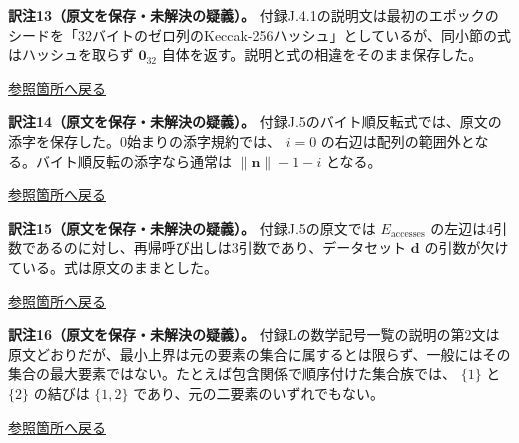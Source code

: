\documentclass[
]{ltjsarticle}
\begin{document}
\leavevmode{}%
\textbf{訳注13（原文を保存・未解決の疑義）。}
付録J.4.1の説明文は最初のエポックのシードを「32バイトのゼロ列のKeccak-256ハッシュ」としているが、同小節の式はハッシュを取らず
\(\mathbf{0}_{32}\) 自体を返す。説明と式の相違をそのまま保存した。

\protect\hyperlink{tnref-13}{参照箇所へ戻る}

\leavevmode{}%
\textbf{訳注14（原文を保存・未解決の疑義）。}
付録J.5のバイト順反転式では、原文の添字を保存した。0始まりの添字規約では、
\(i=0\) の右辺は配列の範囲外となる。バイト順反転の添字なら通常は
\(\lVert\mathbf{n}\rVert-1-i\) となる。

\protect\hyperlink{tnref-14}{参照箇所へ戻る}

\leavevmode{}%
\textbf{訳注15（原文を保存・未解決の疑義）。} 付録J.5の原文では
\(E_{\mathrm{accesses}}\)
の左辺は4引数であるのに対し、再帰呼び出しは3引数であり、データセット
\(\mathbf{d}\) の引数が欠けている。式は原文のままとした。

\protect\hyperlink{tnref-15}{参照箇所へ戻る}

\leavevmode{}%
\textbf{訳注16（原文を保存・未解決の疑義）。}
付録Lの数学記号一覧の説明の第2文は原文どおりだが、最小上界は元の要素の集合に属するとは限らず、一般にはその集合の最大要素ではない。たとえば包含関係で順序付けた集合族では、
\(\{1\}\) と \(\{2\}\) の結びは \(\{1,2\}\)
であり、元の二要素のいずれでもない。

\protect\hyperlink{tnref-16}{参照箇所へ戻る}
\end{document}
